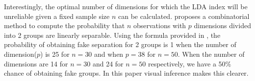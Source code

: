 
Interestingly, the optimal number of dimensions for which the LDA index will be unreliable given a fixed sample size $n$ can be calculated. \cite{ripley:1996} proposes a combinatorial method to compute the probability that $n$ observations with $p$ dimensions divided into 2 groups are linearly separable. 
Using the formula provided in \cite{ripley:1996},  the probability of obtaining fake separation for 2 groups is 1 when the number of dimension($p$) is 25 for $n = 30$ and when $p = 38$ for $n = 50$. When the number of dimensions are 14 for $n = 30$ and 24 for $n = 50$ respectively, we have a 50\% chance of obtaining fake groups. In this paper visual inference makes this clearer.






